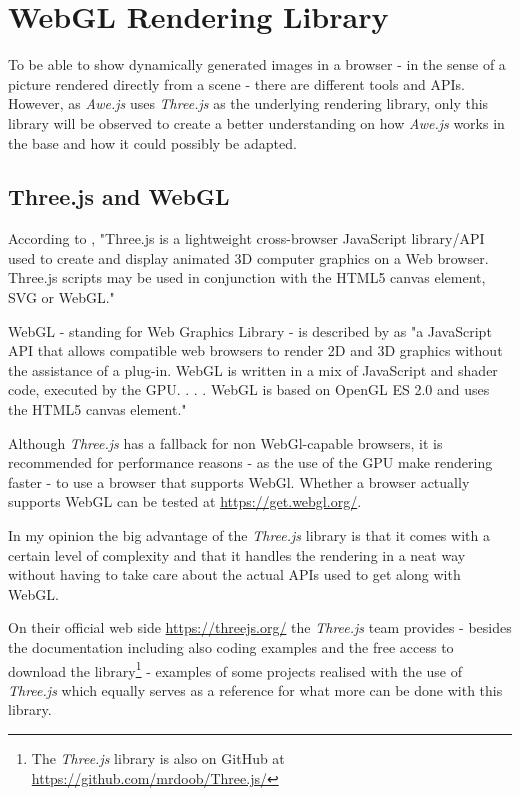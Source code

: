 \chapter{WebGL Rendering Library}
\label{chp:WebGL Rendering Library}

To be able to show dynamically generated images in a browser - in the sense of a picture rendered directly from a scene - there are different tools and APIs. However, as \textit{Awe.js} uses \textit{Three.js} as the underlying rendering library, only this library will be observed to create a better understanding on how \textit{Awe.js} works in the base and how it could possibly be adapted.

\section{Three.js and WebGL}

According to \cite{Profenza2010Three.jsOverflow}, "Three.js is a lightweight cross-browser JavaScript library/API used to create and display animated 3D computer graphics on a Web browser. Three.js scripts may be used in conjunction with the HTML5 canvas element, SVG or WebGL."

WebGL - standing for Web Graphics Library - is described by \cite{ComputerHope2017WebGL} as "a JavaScript API that allows compatible web browsers to render 2D and 3D graphics without the assistance of a plug-in. WebGL is written in a mix of JavaScript and shader code, executed by the GPU. . . . WebGL is based on OpenGL ES 2.0 and uses the HTML5 canvas element." 

Although \textit{Three.js} has a fallback for non WebGl-capable browsers, it is recommended for performance reasons - as the use of the GPU make rendering faster - to use a browser that supports WebGl. Whether a browser actually supports WebGL can be tested at \url{https://get.webgl.org/}.

In my opinion the big advantage of the \textit{Three.js} library is that it comes with a certain level of complexity and that it handles the rendering in a neat way without having to take care about the actual APIs used to get along with WebGL.

On their official web side \url{https://threejs.org/} the \textit{Three.js} team provides - besides the  documentation including also coding examples and the free access to download the library\footnote{The \textit{Three.js} library is also on GitHub at \url{https://github.com/mrdoob/Three.js/}} - examples of some projects realised with the use of \textit{Three.js} which equally serves  as a reference for what more can be done with this library.


